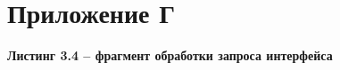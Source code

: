 \chapter*{Приложение Г}\label{ux43fux440ux438ux43bux43eux436ux435ux43dux438ux435-ux433}

\textbf{Листинг 3.4 -- фрагмент обработки запроса интерфейса}


